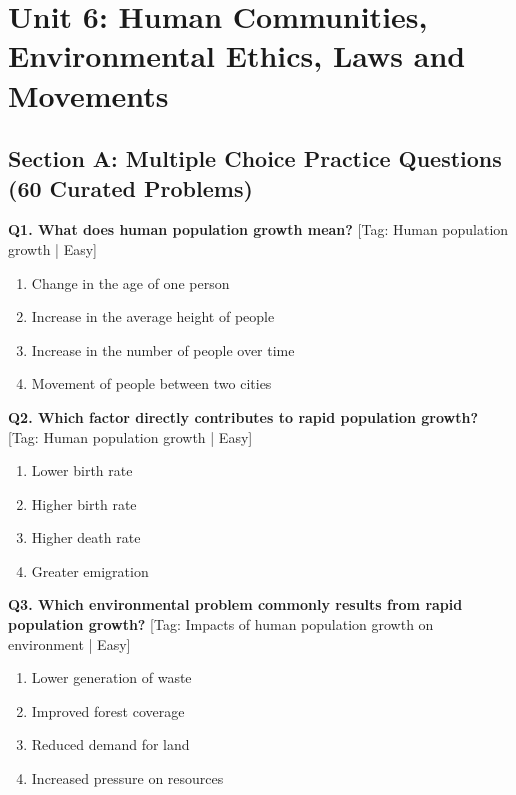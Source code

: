 \chapter{Unit 6: Human Communities, Environmental Ethics, Laws and Movements}

\section{Section A: Multiple Choice Practice Questions (60 Curated Problems)}

\noindent\textbf{Q1. What does human population growth mean?} \hfill [Tag: Human population growth | Easy]
\begin{enumerate}[label=(\alph*),topsep=2pt,itemsep=1pt,partopsep=0pt,parsep=0pt]
    \item {Change in the age of one person}
    \item {Increase in the average height of people}
    \item {Increase in the number of people over time}
    \item {Movement of people between two cities}
\end{enumerate}
\vspace{2mm}

\noindent\textbf{Q2. Which factor directly contributes to rapid population growth?} \hfill [Tag: Human population growth | Easy]
\begin{enumerate}[label=(\alph*),topsep=2pt,itemsep=1pt,partopsep=0pt,parsep=0pt]
    \item {Lower birth rate}
    \item {Higher birth rate}
    \item {Higher death rate}
    \item {Greater emigration}
\end{enumerate}
\vspace{2mm}

\noindent\textbf{Q3. Which environmental problem commonly results from rapid population growth?} \hfill [Tag: Impacts of human population growth on environment | Easy]
\begin{enumerate}[label=(\alph*),topsep=2pt,itemsep=1pt,partopsep=0pt,parsep=0pt]
    \item {Lower generation of waste}
    \item {Improved forest coverage}
    \item {Reduced demand for land}
    \item {Increased pressure on resources}
\end{enumerate}
\vspace{2mm}

